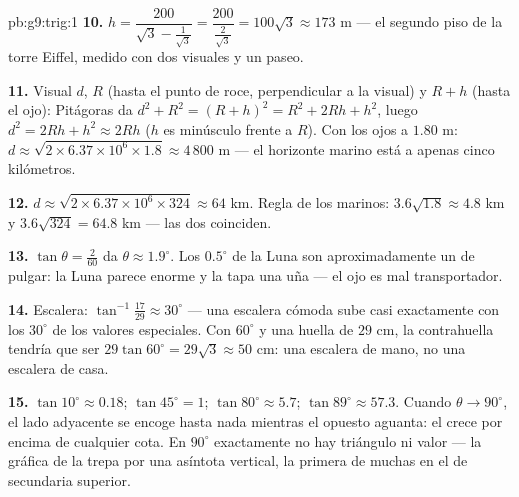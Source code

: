 \begin{solution}{pb:g9:trig:1}
\textbf{10.} $h = \dfrac{200}{\sqrt3 - \frac{1}{\sqrt3}}
= \dfrac{200}{\frac{2}{\sqrt3}} = 100\sqrt3 \approx 173$ m ---
el segundo piso de la torre Eiffel, medido con dos visuales
y un paseo.

\textbf{11.} Visual $d$,  $R$ (hasta el punto de roce,
perpendicular a la visual) y $R + h$ (hasta el ojo):
Pitágoras da $d^2 + R^2 = (R + h)^2 = R^2 + 2Rh + h^2$, luego
$d^2 = 2Rh + h^2 \approx 2Rh$ ($h$ es minúsculo frente a $R$).
Con los ojos a $1.80$ m:
$d \approx \sqrt{2 \times 6.37 \times 10^6 \times 1.8}
\approx 4\,800$ m --- el horizonte marino está a apenas cinco
kilómetros.

\textbf{12.} $d \approx \sqrt{2 \times 6.37 \times 10^6 \times
324} \approx 64$ km. Regla de los marinos: $3.6\sqrt{1.8} \approx
4.8$ km y $3.6\sqrt{324} = 64.8$ km --- las dos coinciden.

\textbf{13.} $\tan\theta = \frac{2}{60}$ da $\theta \approx
1.9^\circ$. Los $0.5^\circ$ de la Luna son aproximadamente un \emph{} de
pulgar: la Luna parece enorme y la tapa una uña
--- el ojo es mal transportador.

\textbf{14.} Escalera: $\tan^{-1}\frac{17}{29} \approx 30^\circ$
--- una escalera cómoda sube casi exactamente con los
$30^\circ$ de los valores especiales. Con $60^\circ$ y una huella de $29$ cm,
la contrahuella tendría que ser $29\tan 60^\circ = 29\sqrt3 \approx
50$ cm: una escalera de mano, no una escalera de casa.

\textbf{15.} $\tan 10^\circ \approx 0.18$;
$\tan 45^\circ = 1$; $\tan 80^\circ \approx 5.7$;
$\tan 89^\circ \approx 57.3$. Cuando $\theta \to 90^\circ$, el
lado adyacente se encoge hasta nada mientras el opuesto aguanta:
el  crece por encima de cualquier cota. En $90^\circ$ exactamente
no hay triángulo ni valor --- la gráfica de la 
trepa por una asíntota vertical, la primera de muchas en el 
de secundaria superior.
\end{solution}
